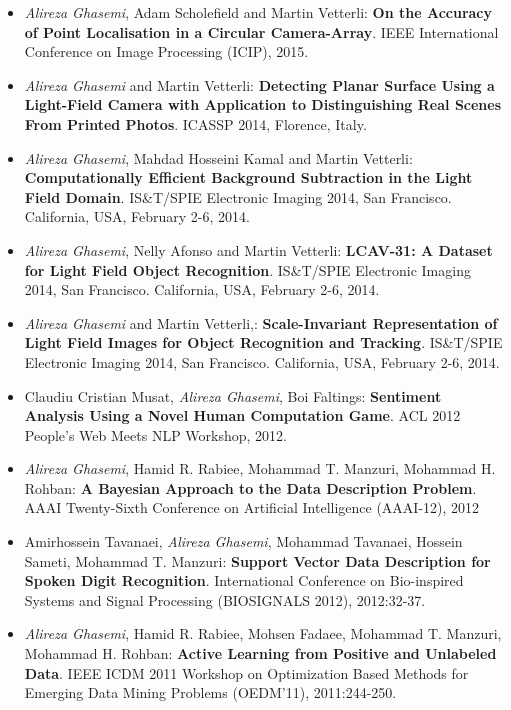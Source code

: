 \documentclass[11pt,a4paper,sans]{moderncv}        %
\begin{document}
{
\begin{itemize}
\item \textit{Alireza Ghasemi}, Adam Scholefield and Martin Vetterli:\textbf{ On the Accuracy of Point Localisation in a Circular Camera-Array}. IEEE International Conference on Image Processing (ICIP), 2015.


\item \textit{Alireza Ghasemi} and Martin Vetterli:\textbf{ Detecting Planar Surface Using a Light-Field Camera with Application
to Distinguishing Real Scenes From Printed Photos}.  ICASSP 2014, Florence, Italy.

\item \textit{Alireza Ghasemi}, Mahdad Hosseini Kamal  and Martin Vetterli: \textbf{Computationally Efficient Background Subtraction in the Light Field Domain}.  IS\&T/SPIE Electronic Imaging 2014, San Francisco. California, USA, February 2-6, 2014.

\item \textit{Alireza Ghasemi}, Nelly Afonso  and Martin Vetterli: \textbf{LCAV-31: A Dataset for Light Field Object Recognition}.  IS\&T/SPIE Electronic Imaging 2014, San Francisco. California, USA, February 2-6, 2014.

\item \textit{Alireza Ghasemi} and Martin Vetterli,: \textbf{Scale-Invariant Representation of Light Field Images for Object Recognition and Tracking}.  IS\&T/SPIE Electronic Imaging 2014, San Francisco. California, USA, February 2-6, 2014.



\item Claudiu Cristian Musat, \textit{Alireza Ghasemi}, Boi Faltings: \textbf{Sentiment Analysis Using a Novel Human Computation Game}.  ACL 2012 People's Web Meets NLP Workshop, 2012.

\item \textit{Alireza Ghasemi}, Hamid R. Rabiee,  Mohammad T. Manzuri, Mohammad H. Rohban:\textbf{ A Bayesian Approach to the Data Description Problem}.  AAAI Twenty-Sixth Conference on Artificial Intelligence (AAAI-12), 2012

\item Amirhossein Tavanaei,\textit{ Alireza Ghasemi}, Mohammad Tavanaei, Hossein Sameti, Mohammad T. Manzuri: \textbf{Support Vector Data Description for Spoken Digit Recognition}. International Conference on Bio-inspired Systems and Signal Processing (BIOSIGNALS 2012), 2012:32-37.

\item \textit{Alireza Ghasemi}, Hamid R. Rabiee, Mohsen Fadaee, Mohammad T. Manzuri, Mohammad H. Rohban:\textbf{ Active Learning from Positive and Unlabeled Data}. IEEE ICDM 2011 Workshop on Optimization Based Methods for Emerging Data Mining Problems (OEDM'11), 2011:244-250.


\end{itemize}}
\end{document}
